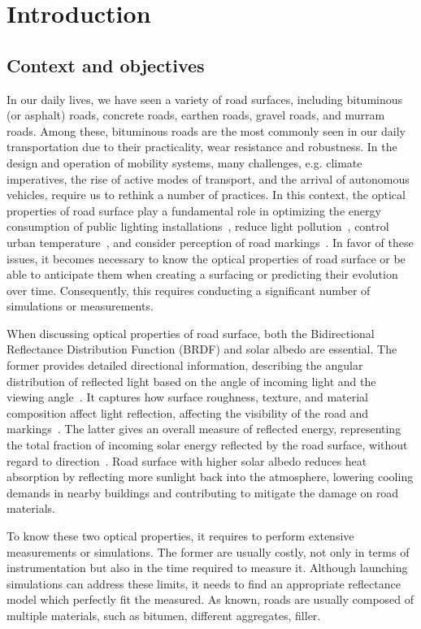 \chapter{Introduction}

\section{Context and objectives}

In our daily lives, we have seen a variety of road surfaces, including bituminous (or asphalt) roads, concrete roads, earthen roads, gravel roads, and murram roads. 
Among these, bituminous roads are the most commonly seen in our daily transportation due to their practicality, wear resistance and robustness.
In the design and operation of mobility systems, many challenges, e.g. climate imperatives, the rise of active modes of transport, and the arrival of autonomous vehicles, require us to rethink a number of practices.
In this context, the optical properties of road surface play a fundamental role in optimizing the energy consumption of public lighting installations~\cite{2021_Muzet}, reduce light pollution~\cite{2019_Muzet}, control urban temperature~\cite{2018_Rossi}, and consider perception of road markings~\cite{2020_Burghardt}.
In favor of these issues, it becomes necessary to know the optical properties of road surface or be able to anticipate them when creating a surfacing or predicting their evolution over time.
Consequently, this requires conducting a significant number of simulations or measurements.


When discussing optical properties of road surface, both the Bidirectional Reflectance Distribution Function (BRDF) and solar albedo are essential.
The former provides detailed directional information, describing the angular distribution of reflected light based on the angle of incoming light and the viewing angle~\cite{2008_Jarosz}. 
It captures how surface roughness, texture, and material composition affect light reflection, affecting the visibility of the road and markings~\cite{2010_Roser}.
The latter gives an overall measure of reflected energy, representing the total fraction of incoming solar energy reflected by the road surface, without regard to direction~\cite{2011_KUSHARI}.
Road surface with higher solar albedo reduces heat absorption by reflecting more sunlight back into the atmosphere, lowering cooling demands in nearby buildings and contributing to mitigate the damage on road materials. 


To know these two optical properties, it requires to perform extensive measurements or simulations.
The former are usually costly, not only in terms of instrumentation but also in the time required to measure it.
Although launching simulations can address these limits, it needs to find an appropriate reflectance model which perfectly fit the measured.
As known, roads are usually composed of multiple materials, such as bitumen, different aggregates, filler.






